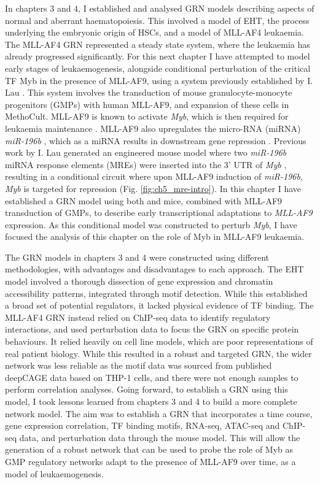 In chapters 3 and 4, I established and analysed GRN models describing aspects of normal and aberrant haematopoiesis. This involved a model of EHT, the process underlying the embryonic origin of HSCs, and a model of MLL-AF4 leukaemia. The MLL-AF4 GRN represented a steady state system, where the leukaemia has already progressed significantly. For this next chapter I have attempted to model early stages of leukaemogenesis, alongside conditional perturbation of the critical TF Myb in the presence of MLL-AF9, using a system previously established by I. Lau \citep{lau_role_2022}. This system involves the transduction of mouse granulocyte-monocyte progenitors (GMPs) with human MLL-AF9, and expansion of these cells in MethoCult. MLL-AF9 is known to activate \textit{Myb}, which is then required for leukaemia maintenance \citep{zuber_integrated_2011}. MLL-AF9 also upregulates the micro-RNA (miRNA) \textit{miR-196b} \citep{popovic_regulation_2009}, which as a miRNA results in downstream gene repression \citep{huntzinger_gene_2011}. Previous work by I. Lau generated an engineered mouse model where two \textit{miR-196b} miRNA response elements (MREs) were inserted into the 3' UTR of \textit{Myb} \citep{lau_role_2022}, resulting in a conditional circuit where upon MLL-AF9 induction of \textit{miR-196b}, \textit{Myb} is targeted for repression (Fig. \ref{fig:ch5_mre-intro}). In this chapter I have established a GRN model using both \mybwt{} and \mybmre{} mice, combined with MLL-AF9 transduction of GMPs, to describe early transcriptional adaptations to \textit{MLL-AF9} expression. As this \mybmre{} conditional model was constructed to perturb \textit{Myb}, I have focused the analysis of this chapter on the role of Myb in MLL-AF9 leukaemia.

The GRN models in chapters 3 and 4 were constructed using different methodologies, with advantages and disadvantages to each approach. The EHT model involved a thorough dissection of gene expression and chromatin accessibility patterns, integrated through motif detection. While this established a broad set of potential regulators, it lacked physical evidence of TF binding. The MLL-AF4 GRN instead relied on ChIP-seq data to identify regulatory interactions, and used perturbation data to focus the GRN on specific protein behaviours. It relied heavily on cell line models, which are poor representations of real patient biology. While this resulted in a robust and targeted GRN, the wider network was less reliable as the motif data was sourced from published deepCAGE data based on THP-1 cells, and there were not enough samples to perform correlation analyses. Going forward, to establish a GRN using this \mybmre{} model, I took lessons learned from chapters 3 and 4 to build a more complete network model. The aim was to establish a GRN that incorporates a time course, gene expression correlation, TF binding motifs, RNA-seq, ATAC-seq and ChIP-seq data, and perturbation data through the \mybmre{} mouse model. This will allow the generation of a robust network that can be used to probe the role of Myb as GMP regulatory networks adapt to the presence of MLL-AF9 over time, as a model of leukaemogenesis. 

